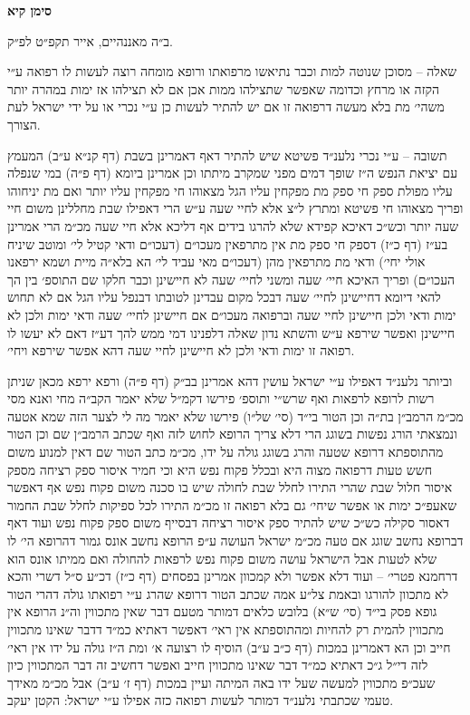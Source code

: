 \documentclass[12pt, openany]{book}
\newcommand{\chapname}{}
\newcommand{\newchap}[1]{
	\addcontentsline{toc}{chapter}{#1}
	\renewcommand{\chapname}{#1}
		\begin{center}
			\textbf{%
\fontsize{16pt}{16pt}\selectfont
				#1}
		\end{center}
}
\begin{document}
\newchap{סימן קיא}
\begin{multicols}{2}
ב״ה מאננהיים, אייר תקפ״ט לפ״ק.\\\vspace{0pt}

שאלה – מסוכן שנוטה למות וכבר נתיאשו מרפואתו ורופא מומחה רוצה לעשות לו רפואה ע״י הקזה או מרחץ וכדומה שאפשר שתצילהו ממות אכן אם לא תצילהו אז ימות במהרה יותר משהי׳ מת בלא מעשה דרפואה זו אם יש להתיר לעשות כן ע״י נכרי או על ידי ישראל לעת הצורך.\\\vspace{0pt}

תשובה – ע״י נכרי נלענ״ד פשיטא שיש להתיר דאף דאמרינן בשבת (דף קנ״א ע״ב) המעמץ עם יציאת הנפש ה״ז שופך דמים מפני שמקרב מיתתו וכן אמרינן ביומא (דף פ״ה) במי שנפלה עליו מפולת ספק חי ספק מת מפקחין עליו הגל מצאוהו חי מפקחין עליו יותר ואם מת יניחוהו ופריך מצאוהו חי פשיטא ומתרץ ל״צ אלא לחיי שעה ע״ש הרי דאפילו שבת מחללינן משום חיי שעה יותר וכש״כ דאיכא קפידא שלא להרגו בידים אף דליכא אלא חיי שעה מכ״מ הרי אמרינן בע״ז (דף כ״ז) דספק חי ספק מת אין מתרפאין מעכו״ם (דעכו״ם ודאי קטיל לי׳ ומוטב שיניח אולי יחי׳) ודאי מת מתרפאין מהן (דעכו״ם מאי עביד לי׳ הא בלא״ה מיית ושמא ירפאנו העכו״ם) ופריך האיכא חיי׳ שעה ומשני לחיי׳ שעה לא חיישינן וכבר חלקו שם התוספ׳ בין הך להאי דיומא דחיישינן לחיי׳ שעה דבכל מקום עבדינן לטובתו דבנפל עליו הגל אם לא תחוש ימות ודאי ולכן חיישינן לחיי שעה וברפואה מעכו״ם אם חיישינן לחיי׳ שעה ודאי ימות ולכן לא חיישינן ואפשר שירפא ע״ש והשתא נדון שאלה דלפנינו דמי ממש להך דע״ז דאם לא יעשו לו רפואה זו ימות ודאי ולכן לא חיישינן לחיי שעה דהא אפשר שירפא ויחי׳.\\\vspace{0pt}

וביותר נלענ״ד דאפילו ע״י ישראל עושין דהא אמרינן בב״ק (דף פ״ה) ורפא ירפא מכאן שניתן רשות לרופא לרפאות ואף שרש״י ותוספ׳ פירשו דקמ״ל שלא יאמר הקב״ה מחי ואנא מסי מכ״מ הרמב״ן בת״ה וכן הטור בי״ד (סי׳ של״ו) פירשו שלא יאמר מה לי לצער הזה שמא אטעה ונמצאתי הורג נפשות בשוגג הרי דלא צריך הרופא לחוש לזה ואף שכתב הרמב״ן שם וכן הטור מהתוספתא דרופא שטעה והרג בשוגג גולה על ידו, מכ״מ כתב הטור שם דאין למנוע משום חשש טעות דרפואה מצוה היא ובכלל פקוח נפש היא וכי חמיר איסור ספק רציחה מספק איסור חלול שבת שהרי התירו לחלל שבת לחולה שיש בו סכנה משום פקוח נפש אף דאפשר שאעפ״כ ימות או אפשר שיחי׳ גם בלא רפואה זו מכ״מ התירו לכל ספיקות לחלל שבת החמור דאסור סקילה כש״כ שיש להתיר ספק איסור רציחה דבסייף משום ספק פקוח נפש ועוד דאף דברופא נחשב שוגג אם טעה מכ״מ ישראל העושה ע״פ הרופא נחשב אונס גמור דהרופא הי׳ לו שלא לטעות אבל הישראל עושה משום פקוח נפש לרפאות להחולה ואם ממיתו אונס הוא דרחמנא פטרי׳ – ועוד דלא אפשר ולא קמכוון אמרינן בפסחים (דף כ״ז) דכ״ע ס״ל דשרי והכא לא מתכוון להורגו ובאמת צל״ע אמה שכתב הטור דרופא שהרג ע״י רפואתו גולה דהרי הטור גופא פסק בי״ד (סי׳ ש״א) בלובש כלאים דמותר מטעם דבר שאין מתכווין וה״נ הרופא אין מתכווין להמית רק להחיות ומהתוספתא אין ראי׳ דאפשר דאתיא כמ״ד דדבר שאינו מתכווין חייב וכן הא דאמרינן במכות (דף כ״ב ע״ב) הוסיף לו רצועה א׳ ומת ה״ז גולה על ידו אין ראי׳ לזה די״ל ג״כ דאתיא כמ״ד דבר שאינו מתכווין חייב ואפשר דחשיב זה דבר המתכווין כיון שעכ״פ מתכווין למעשה שעל ידו באה המיתה ועיין במכות (דף ז׳ ע״ב) אבל מכ״מ מאידך טעמי שכתבתי נלענ״ד דמותר לעשות רפואה כזה אפילו ע״י ישראל: הקטן יעקב.\\\vspace{0pt}


\end{multicols}
\end{document}
